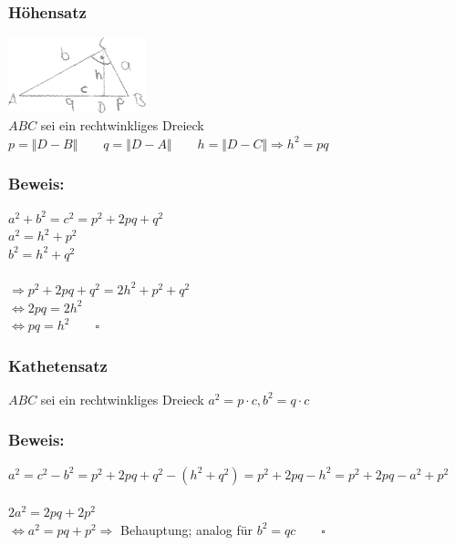 \subsubsection{Höhensatz}
\includegraphics[width=0.3\textwidth]
	{mainmatter/chapter1/pics/heohensatz.png}\\
	$ABC$ sei ein rechtwinkliges Dreieck
	$p=\Vert D-B \Vert \qquad q=\Vert D-A\Vert \qquad h=\Vert D-C\Vert \Rightarrow h^{2}=pq$
%
%
%
\subsubsection{Beweis:}
$a^{2} + b^{2} = c^{2} = p^{2} + 2pq + q^{2}$\\
$a^{2}=h^{2}+p^{2}$\\
$b^{2}=h^{2}+q^{2}$\\
\qquad\\
$\Rightarrow p^{2} + 2pq +q^{2} = 2h^{2}+p^{2}+q^{2}$\\
$\Leftrightarrow 2pq = 2h^{2}$\\
$\Leftrightarrow pq=h^{2} \qquad \square$
%
%
%
\subsubsection{Kathetensatz}
$ABC$ sei ein rechtwinkliges Dreieck
$a^{2} = p\cdot c, b^{2} = q\cdot c$
%
%
%
\subsubsection{Beweis:}
$a^{2} = c^{2}-b^{2}=p^{2}+2pq+q^{2}-(h^{2}+q^{2})=p^{2}+2pq-h^{2}=p^{2}+2pq-a^{2}+p^{2}$\\
\qquad\\
$2a^{2}=2pq+2p^{2}$\\
$\Leftrightarrow a^{2} = pq+p^{2} \Rightarrow$ Behauptung; analog für $b^{2} = qc \qquad\square$